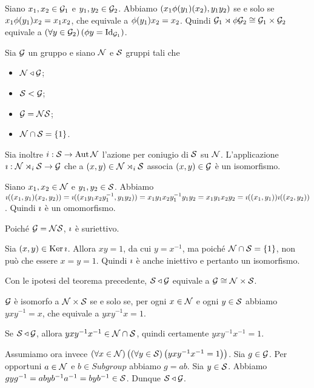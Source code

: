 \Proof
Siano $x_1, x_2 \in \mathcal{G}_1$ e $y_1, y_2 \in \mathcal{G}_2$.
Abbiamo
$(x_1\phi(y_1)(x_2),y_1y_2)$
se e solo se
$x_1\phi(y_1)x_2 = x_1x_2$,
che equivale a
$\phi(y_1)x_2 = x_2$.
Quindi
$\Isomorphic{\Group_1 \SemidirectProduct{\Homomorphism} \Group_2}
{\Group_1 \times \Group_2}$ equivale a
$\ForAll{y \in \Group_2}
{\Homomorphism{y} = \Identity[\Group_1]}$.
\EndProof
\begin{Theorem}
	Sia $\mathcal{G}$ un gruppo e siano
	$\mathcal{N}$ e $\mathcal{S}$ gruppi tali che
	\begin{itemize}
		\item
		$\mathcal{N} \triangleleft \mathcal{G}$;
		\item
		$\mathcal{S} < \mathcal{G}$;
		\item
		$\mathcal{G} = \mathcal{N}\mathcal{S}$;
		\item
		$\mathcal{N} \cap \mathcal{S} = \lbrace 1 \rbrace$.
	\end{itemize}
	Sia inoltre $\InnerAutomorphism: \Subgroup \rightarrow \Automorphisms{\NormalSubgroup}$ l'azione per
	coniugio di $\mathcal{S}$ su $\mathcal{N}$.
	L'applicazione
	$\Isomorphism: \NormalSubgroup \SemidirectProduct_{\InnerAutomorphism} \Subgroup \rightarrow
	\Group$
	che a $(x,y) \in \NormalSubgroup \SemidirectProduct_{\InnerAutomorphism} \Subgroup$ associa
	$(x,y) \in \mathcal{G}$ \`e un isomorfismo.
\end{Theorem}
\Proof
Siano $x_1,x_2 \in \mathcal{N}$ e $y_1,y_2 \in \mathcal{S}$.
Abbiamo $\imath((x_1,y_1)(x_2,y_2)) =
\imath((x_1y_1x_2y_1^{-1},y_1y_2)) =
x_1y_1x_2y_1^{-1}y_1y_2 =
x_1y_1x_2y_2 =
\imath((x_1,y_1))\imath((x_2,y_2))$.
Quindi $\imath$ \`e un omomorfismo.
\par
Poich\'e $\mathcal{G} = \mathcal{N}\mathcal{S}$,
$\imath$ \`e suriettivo.
\par
Sia $(x,y) \in \operatorname{Ker}{\imath}$. Allora
$xy = 1$, da cui $y = x^{-1}$, ma poich\'e
$\mathcal{N} \cap \mathcal{S} = \lbrace 1 \rbrace$,
non pu\`o che essere $x = y = 1$. Quindi $\imath$
\`e anche iniettivo e pertanto un isomorfismo. \EndProof
\begin{Corollary}
	Con le ipotesi del teorema precedente,
	$\mathcal{S} \triangleleft \mathcal{G}$
	equivale a $\mathcal{G} \cong \mathcal{N} \times \mathcal{S}$.
\end{Corollary}
\Proof
$\mathcal{G}$ \`e isomorfo a $\mathcal{N} \times \mathcal{S}$
se e solo se, per ogni $x \in \mathcal{N}$ e ogni
$y \in \mathcal{S}$ abbiamo $yxy^{-1} = x$, che equivale a
$yxy^{-1}x = 1$.
\par
Se $\mathcal{S} \triangleleft \mathcal{G}$, allora
$yxy^{-1}x^{-1} \in \mathcal{N} \cap \mathcal{S}$, quindi
certamente $yxy^{-1}x^{-1} = 1$.
\par
Assumiamo ora invece 
$\left ( \forall x \in \mathcal{N} \right ) \left ( \left ( \forall y \in \mathcal{S} \right ) \left ( yxy^{-1}x^{-1} = 1 \right ) \right )$.
Sia $g \in \mathcal{G}$. Per opportuni $a \in \mathcal{N}$ e
$b \in Subgroup$ abbiamo $g = ab$.
Sia $y \in \mathcal{S}$.
Abbiamo $gyg^{-1} =
abyb^{-1}a^{-1} =
byb^{-1} \in \mathcal{S}$.
Dunque $\mathcal{S} \triangleleft \mathcal{G}$.
\EndProof
